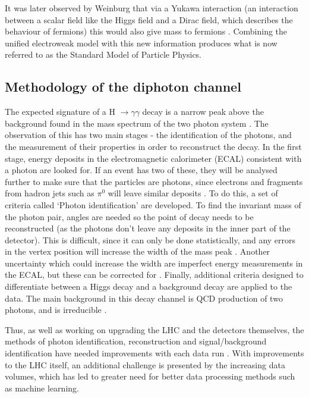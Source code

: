 \documentclass[12pt]{article}
\begin{document}
It was later observed by Weinburg that via a Yukawa interaction (an interaction between a scalar field like the Higgs field and a Dirac field, which describes the behaviour of fermions) this would also give mass to fermions \cite{lepmass}. Combining the unified electroweak model with this new information produces what is now referred to as the Standard Model of Particle Physics. 


\subsection*{Methodology of the diphoton channel}
The expected signature of a H $\rightarrow \gamma\gamma$ decay is a narrow peak above the background found in the mass spectrum of the two photon system \cite{sethpresentation}. The observation of this has two main stages - the identification of the photons, and the measurement of their properties in order to reconstruct the decay. In the first stage, energy deposits in the electromagnetic calorimeter (ECAL) consistent with a photon are looked for. If an event has two of these, they will be analysed further to make sure that the particles are photons, since electrons and fragments from hadron jets such as $\pi^{0}$ will leave similar deposits \cite{recon}. To do this, a set of criteria called `Photon identification' are developed. To find the invariant mass of the photon pair, angles are needed so the point of decay needs to be reconstructed (as the photons don't leave any deposits in the inner part of the detector). This is difficult, since it can only be done statistically, and any errors in the vertex position will increase the width of the mass peak \cite{review1}. Another uncertainty which could increase the width are imperfect energy measurements in the ECAL, but these can be corrected for \cite{cmslimits}. Finally, additional criteria designed to differentiate between a Higgs decay and a background decay are applied to the data. The main background in this decay channel is QCD production of two photons, and is irreducible \cite{atlaslimits}. 

Thus, as well as working on upgrading the LHC and the detectors themselves, the methods of photon identification, reconstruction and signal/background identification have needed improvements with each data run \cite{cms13tev1}. With improvements to the LHC itself, an additional challenge is presented by the increasing data volumes, which has led to greater need for better data processing methods such as machine learning.
\end{document}
